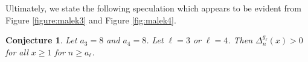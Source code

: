 \documentclass[11pt,reqno]{amsart}
\theoremstyle{plain}
\newtheorem{conjecture}{Conjecture}
\theoremstyle{remark}
\theoremstyle{definition}
\numberwithin{equation}{section}
\begin{document}
Ultimately,
we state the following speculation
which
appears to be evident
from Figure \ref{figure:malek3} and Figure \ref{fig:malek4}.

\begin{conjecture} Let $a_3=
8$ and $a_4=8
$. Let $\ell=3$
or $\ell=4$.
Then $\Delta _{n}^{g_{\ell}}\left( x\right)
>0
$ for all $x\geq 1$ for $n\geq
a_{\ell }$.
\end{conjecture}

%
%

\end{document}
